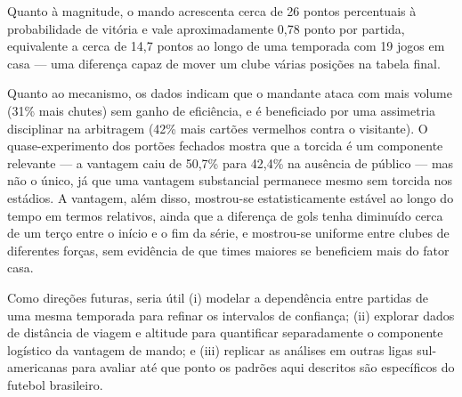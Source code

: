 \documentclass[pdflatex,sn-mathphys-num]{sn-jnl}%
\theoremstyle{thmstyleone}%
\theoremstyle{thmstyletwo}%
\theoremstyle{thmstylethree}%
\begin{document}
Quanto à magnitude, o mando acrescenta cerca de 26 pontos percentuais à probabilidade de vitória e vale aproximadamente 0,78 ponto por partida, equivalente a cerca de 14,7 pontos ao longo de uma temporada com 19 jogos em casa --- uma diferença capaz de mover um clube várias posições na tabela final.

Quanto ao mecanismo, os dados indicam que o mandante ataca com mais volume (31\% mais chutes) sem ganho de eficiência, e é beneficiado por uma assimetria disciplinar na arbitragem (42\% mais cartões vermelhos contra o visitante). O quase-experimento dos portões fechados mostra que a torcida é um componente relevante --- a vantagem caiu de 50,7\% para 42,4\% na ausência de público --- mas não o único, já que uma vantagem substancial permanece mesmo sem torcida nos estádios. A vantagem, além disso, mostrou-se estatisticamente estável ao longo do tempo em termos relativos, ainda que a diferença de gols tenha diminuído cerca de um terço entre o início e o fim da série, e mostrou-se uniforme entre clubes de diferentes forças, sem evidência de que times maiores se beneficiem mais do fator casa.

Como direções futuras, seria útil (i) modelar a dependência entre partidas de uma mesma temporada para refinar os intervalos de confiança; (ii) explorar dados de distância de viagem e altitude para quantificar separadamente o componente logístico da vantagem de mando; e (iii) replicar as análises em outras ligas sul-americanas para avaliar até que ponto os padrões aqui descritos são específicos do futebol brasileiro.


\backmatter
\end{document}
